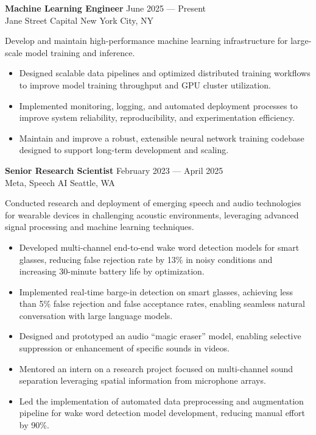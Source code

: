 \documentclass[a4paper,9pt]{extarticle} %
\begin{document}
\textbf{Machine Learning Engineer} \hfill June 2025 --- Present \\
Jane Street Capital \hfill New York City, NY\\
\vspace{-1.5\parskip}

Develop and maintain high-performance machine learning infrastructure for large-scale model training and inference.
\vspace{-.9\parskip}
\begin{itemize}[nosep]
  \item Designed scalable data pipelines and optimized distributed training workflows to improve model training throughput and GPU cluster utilization.
  \item Implemented monitoring, logging, and automated deployment processes to improve system reliability, reproducibility, and experimentation efficiency.
  \item Maintain and improve a robust, extensible neural network training codebase designed to support long-term development and scaling.
\end{itemize}

\textbf{Senior Research Scientist} \hfill February 2023 --- April 2025 \\
Meta, Speech AI \hfill Seattle, WA \\
\vspace{-1.5\parskip}

Conducted research and deployment of emerging speech and audio technologies for wearable devices in challenging acoustic environments, leveraging advanced signal processing and machine learning techniques.
\vspace{-.9\parskip}
\begin{itemize}[nosep]
  \item Developed multi-channel end-to-end wake word detection models for smart glasses, reducing false rejection rate by 13\% in noisy conditions and increasing 30-minute battery life by optimization.
  \item Implemented real-time barge-in detection on smart glasses, achieving less than 5\% false rejection and false acceptance rates, enabling seamless natural conversation with large language models.
  \item Designed and prototyped an audio ``magic eraser'' model, enabling selective suppression or enhancement of specific sounds in videos.
  \item Mentored an intern on a research project focused on multi-channel sound separation leveraging spatial information from microphone arrays.
  \item Led the implementation of automated data preprocessing and augmentation pipeline for wake word detection model development, reducing manual effort by 90\%.
\end{itemize}
\end{document}
